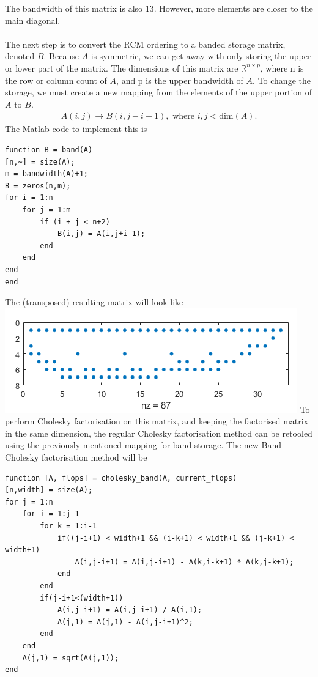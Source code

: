 \documentclass[12pt,a4paper]{article}
\begin{document}
The bandwidth of this matrix is also 13. However, more elements are closer to the main diagonal.
\\\\The next step is to convert the RCM ordering to a banded storage matrix, denoted $B$. Because $A$ is symmetric, we can get away with only storing the upper or lower part of the matrix. The dimensions of this matrix are $\mathbb{R}^{n\times p}$, where n is the row or column count of $A$, and p is the upper bandwidth of $A$. To change the storage, we must create a new mapping from the elements of the upper portion of $A$ to $B$.
\begin{align*}
A(i,j)\to B(i,j-i+1), \text{ where } i,j < \text{dim}(A).
\end{align*}
The Matlab code to implement this is
\begin{verbatim}
function B = band(A)
[n,~] = size(A);
m = bandwidth(A)+1;
B = zeros(n,m);
for i = 1:n
	for j = 1:m
		if (i + j < n+2)
			B(i,j) = A(i,j+i-1);
		end
	end
end
end
\end{verbatim}
The (transposed) resulting matrix will look like \\\includegraphics{images/band.png}
To perform Cholesky factorisation on this matrix, and keeping the factorised matrix in the same dimension, the regular Cholesky factorisation method can be retooled using the previously mentioned mapping for band storage. The new Band Cholesky factorisation method will be
\begin{verbatim}
function [A, flops] = cholesky_band(A, current_flops)
[n,width] = size(A);
for j = 1:n
	for i = 1:j-1
		for k = 1:i-1
			if((j-i+1) < width+1 && (i-k+1) < width+1 && (j-k+1) < width+1)
				A(i,j-i+1) = A(i,j-i+1) - A(k,i-k+1) * A(k,j-k+1);
			end
		end
		if(j-i+1<(width+1))
			A(i,j-i+1) = A(i,j-i+1) / A(i,1);
			A(j,1) = A(j,1) - A(i,j-i+1)^2;
		end
	end
	A(j,1) = sqrt(A(j,1));
end	
\end{verbatim}
\end{document}
